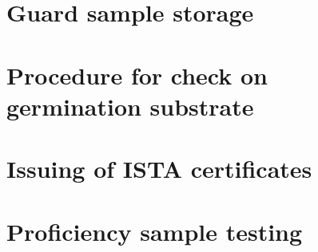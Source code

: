 \documentclass[
]{book}
\begin{document}
\hypertarget{guard-sample-storage}{%
\chapter{Guard sample storage}\label{guard-sample-storage}}

\hypertarget{procedure-for-check-on-germination-substrate}{%
\chapter{Procedure for check on germination substrate}\label{procedure-for-check-on-germination-substrate}}

\hypertarget{issuing-of-ista-certificates}{%
\chapter{Issuing of ISTA certificates}\label{issuing-of-ista-certificates}}

\hypertarget{proficiency-sample-testing}{%
\chapter{Proficiency sample testing}\label{proficiency-sample-testing}}

  
\end{document}
